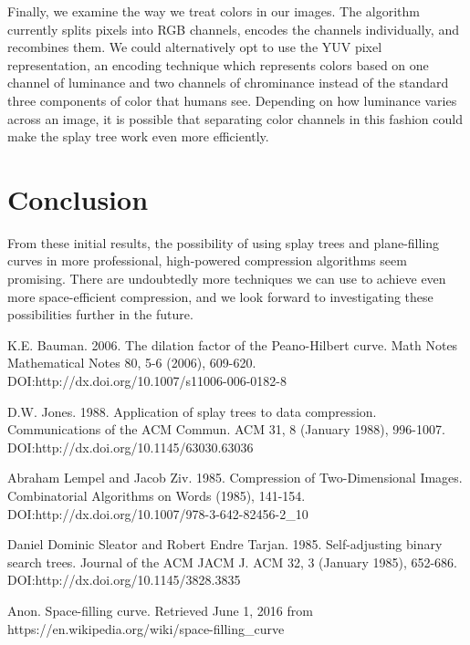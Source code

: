 \documentclass[twoside]{article}
\begin{document}
\begin{multicols}{2}
Finally, we examine the way we treat colors in our images. The algorithm currently splits pixels into RGB channels, encodes the channels individually, and recombines them. We could alternatively opt to use the YUV pixel representation, an encoding technique which represents colors based on one channel of luminance and two channels of chrominance instead of the standard three components of color that humans see. Depending on how luminance varies across an image, it is possible that separating color channels in this fashion could make the splay tree work even more efficiently.
\section{Conclusion}

From these initial results, the possibility of using splay trees and plane-filling curves in more professional, high-powered compression algorithms seem promising. There are undoubtedly more techniques we can use to achieve even more space-efficient compression, and we look forward to investigating these possibilities further in the future.


\begin{thebibliography}{99} %

K.E. Bauman. 2006. The dilation factor of the Peano-Hilbert curve. Math Notes Mathematical Notes 80, 5-6 (2006), 609-620. DOI:http://dx.doi.org/10.1007/s11006-006-0182-8

 D.W. Jones. 1988. Application of splay trees to data compression. Communications of the ACM Commun. ACM 31, 8 (January 1988), 996-1007. DOI:http://dx.doi.org/10.1145/63030.63036 
  
Abraham Lempel and Jacob Ziv. 1985. Compression of Two-Dimensional Images. Combinatorial Algorithms on Words (1985), 141-154. DOI:http://dx.doi.org/10.1007/978-3-642-82456-2\_10

  Daniel Dominic Sleator and Robert Endre Tarjan. 1985. Self-adjusting binary search trees. Journal of the ACM JACM J. ACM 32, 3 (January 1985), 652-686. DOI:http://dx.doi.org/10.1145/3828.3835

Anon. Space-filling curve. Retrieved June 1, 2016 from https://en.wikipedia.org/wiki/space-filling\_curve

\end{thebibliography}

\end{multicols}
\end{document}
